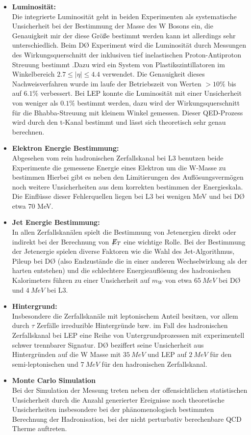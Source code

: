 \documentclass[a4paper,12pt]{article}
\newcommand{\met}{\ensuremath{\not\mathrel{E}}_T}
\begin{document}
\begin{itemize}
	\item \textbf{Luminosität:} \\
	Die integrierte Luminosität geht in beiden Experimenten als systematische Unsicherheit bei der Bestimmung der Masse des W Bosons ein,
	die Genauigkeit mir der diese Größe bestimmt werden kann ist allerdings sehr unterschiedlich. Beim DØ Experiment wird die Luminosität
	durch Messungen des Wirkungsquerschnitt der inklusiven tief inelastischen Proton-Antiproton Streuung bestimmt \cite{2011arXiv1106.5182P}.Dazu
	wird ein System von Plastikszintillatoren im Winkelbereich $2.7 \leq |\eta| \leq 4.4$ verwendet. Die Genauigkeit dieses Nachweisverfahren wurde
	im laufe der Betriebszeit von Werten $ > 10\%$ bis auf $ 6.1\%$ verbessert. Bei LEP konnte die Luminosität mit einer Unsicherheit von weniger
	als $0.1\%$ bestimmt werden, dazu wird der Wirkungsquerschnitt für die Bhabba-Streuung mit kleinem Winkel gemessen. Dieser QED-Prozess
	wird durch den t-Kanal bestimmt und lässt sich theoretisch sehr genau berechnen.
	\item \textbf{Elektron Energie Bestimmung:} \\
	Abgesehen vom rein hadronischen Zerfallskanal bei L3 benutzen beide Experimente die gemessene Energie eines Elektron um die W-Masse zu bestimmen
	Hierbei gibt es neben den Limitierungen des Auflösungsvermögen noch weitere Unsicherheiten aus dem korrekten bestimmen der Energieskala.
	Die Einflüsse dieser Fehlerquellen liegen bei L3 bei wenigen MeV und bei DØ etwa 70 MeV.
	\item \textbf{Jet Energie Bestimmung:} \\
	In allen Zerfallskanälen spielt die Bestimmung von Jetenergien direkt oder indirekt bei der Berechnung von $\met$ eine wichtige Rolle. Bei der
	Bestimmung der Jetenergie spielen diverse Faktoren wie die Wahl des Jet-Algorithmus, Pileup bei DØ (also Endzustände die in einer anderen Wechselwirkung
	als der harten entstehen) und die schlechtere Energieauflösung des hadronischen Kalorimeters führen zu einer Unsicherheit auf $m_{W}$ von
	etwa $\SI{65}{MeV}$ bei DØ und $\SI{4}{MeV}$ bei L3.
	\item \textbf{Hintergrund:}\\
	Insbesondere die Zerfallskanäle mit leptonischem Anteil besitzen, vor allem durch $\tau$ Zerfälle irreduzible Hintergründe bzw. im Fall
	des hadronischen Zerfallskanal bei LEP eine Reihe von Untergrundprozessen mit experimentell schwer trennbarer Signatur. DØ beziffert seine
	Unsicherheit aus Hintergründen auf die W Masse mit $\SI{35}{MeV}$ und LEP auf $\SI{2}{MeV}$ für den semi-leptonischen und $\SI{7}{MeV}$
	für den hadronischen Zerfallskanal.
	\item \textbf{Monte Carlo Simulation}\\
	Bei der Simulation der Messung treten neben der offensichtlichen statistischen Unsicherheit durch die Anzahl generierter Ereignisse noch
	theoretische Unsicherheiten insbesondere bei der phänomenologisch bestimmten Berechnung der Hadronisation, bei der nicht perturbativ berechenbare
	QCD Therme auftreten.
\end{itemize}
\end{document}
